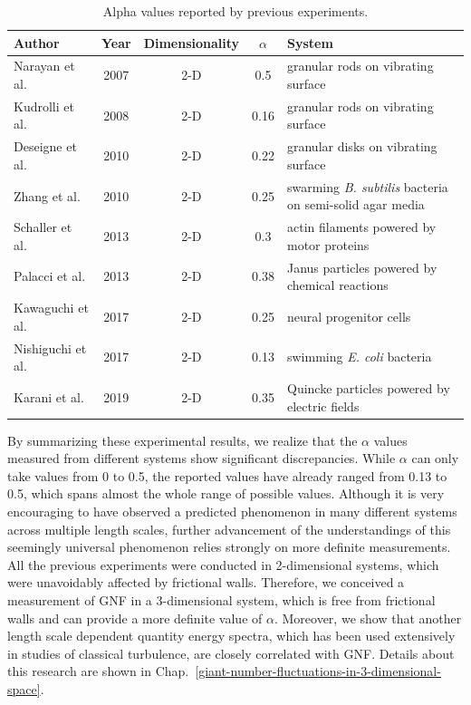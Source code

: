 \begin{table}[h]
	\centering
	\begin{tabular}{  lccc m{2in} }
		\toprule
		Author              & Year & Dimensionality & $\alpha$ & System \\\midrule
		Narayan et al.      & 2007 & 2-D            &  0.5     & granular rods on vibrating surface \\
		Kudrolli et al.     & 2008 & 2-D            &  0.16    & granular rods on vibrating surface \\
		Deseigne et al.     & 2010 & 2-D            &  0.22    & granular disks on vibrating surface \\
		Zhang et al.        & 2010 & 2-D            &  0.25    & swarming \textit{B. subtilis} bacteria on semi-solid agar media \\
		Schaller et al.     & 2013 & 2-D            &  0.3     & actin filaments powered by motor proteins \\
		Palacci et al.      & 2013 & 2-D            &  0.38    & Janus particles powered by chemical reactions \\
		Kawaguchi et al.    & 2017 & 2-D            &  0.25    & neural progenitor cells \\
		Nishiguchi et al.   & 2017 & 2-D            &  0.13    & swimming \textit{E. coli} bacteria \\
		Karani et al.       & 2019 & 2-D            &  0.35    & Quincke particles powered by electric fields \\
		\bottomrule
	\end{tabular}
	\caption{Alpha values reported by previous experiments.}
	\label{table:alpha-values}
\end{table}

By summarizing these experimental results, we realize  that the $\alpha$ values measured from different systems show significant discrepancies. While $\alpha$ can only take values from 0 to 0.5, the reported values have already ranged from 0.13 to 0.5, which spans almost the whole range of possible values.
Although it is very encouraging to have observed a predicted phenomenon in many different systems across multiple length scales, further advancement of the understandings of this seemingly universal phenomenon relies strongly on more definite measurements. All the previous experiments were conducted in 2-dimensional systems, which were unavoidably affected by frictional walls. Therefore, we conceived a measurement of GNF in a 3-dimensional system, which is free from frictional walls and can provide a more definite value of $\alpha$. Moreover, we show that another length scale dependent quantity energy spectra, which has been used extensively in studies of classical turbulence, are closely correlated with GNF. Details about this research are shown in Chap.~\ref{giant-number-fluctuations-in-3-dimensional-space}. 

